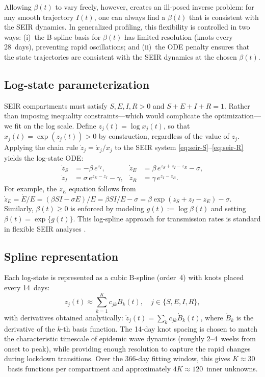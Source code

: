 \documentclass[11pt]{article}
\begin{document}
Allowing $\beta(t)$ to vary freely, however, creates an ill-posed inverse problem: for any smooth trajectory $I(t)$, one can always find a $\beta(t)$ that is consistent with the SEIR dynamics. In generalized profiling, this flexibility is controlled in two ways: (i)~the B-spline basis for $\beta(t)$ has limited resolution (knots every 28~days), preventing rapid oscillations; and (ii)~the ODE penalty ensures that the state trajectories are consistent with the SEIR dynamics at the chosen $\beta(t)$.

\subsection{Log-state parameterization}\label{sec:logstate}

SEIR compartments must satisfy $S, E, I, R > 0$ and $S+E+I+R=1$. Rather than imposing inequality constraints---which would complicate the optimization---we fit on the log scale. Define $z_j(t) = \log x_j(t)$, so that $x_j(t) = \exp(z_j(t)) > 0$ by construction, regardless of the value of $z_j$. Applying the chain rule $\dot{z}_j = \dot{x}_j / x_j$ to the SEIR system \eqref{eq:seir-S}--\eqref{eq:seir-R} yields the log-state ODE:
\begin{align}
  \dot{z}_S &= -\beta\,e^{z_I}, &
  \dot{z}_E &= \beta\,e^{z_S+z_I-z_E}-\sigma, \label{eq:log-SEIR}\\
  \dot{z}_I &= \sigma\,e^{z_E-z_I}-\gamma, &
  \dot{z}_R &= \gamma\,e^{z_I-z_R}. \nonumber
\end{align}
For example, the $\dot{z}_E$ equation follows from $\dot{z}_E = \dot{E}/E = (\beta SI - \sigma E)/E = \beta SI/E - \sigma = \beta \exp(z_S+z_I-z_E) - \sigma$. Similarly, $\beta(t) \geq 0$ is enforced by modeling $g(t) := \log\beta(t)$ and setting $\beta(t) = \exp\{g(t)\}$. This log-spline approach for transmission rates is standard in flexible SEIR analyses \citep{Frasso2016}.

\subsection{Spline representation}\label{sec:splines}

Each log-state is represented as a cubic B-spline (order~4) with knots placed every 14~days:
\begin{equation}
  z_j(t) \approx \sum_{k=1}^{K} c_{jk} B_k(t), \quad j \in \{S,E,I,R\},
\end{equation}
with derivatives obtained analytically: $\dot{z}_j(t) = \sum_k c_{jk}\dot{B}_k(t)$, where $\dot{B}_k$ is the derivative of the $k$-th basis function. The 14-day knot spacing is chosen to match the characteristic timescale of epidemic wave dynamics (roughly 2--4~weeks from onset to peak), while providing enough resolution to capture the rapid changes during lockdown transitions. Over the 366-day fitting window, this gives $K \approx 30$~basis functions per compartment and approximately $4K \approx 120$~inner unknowns.
\end{document}
